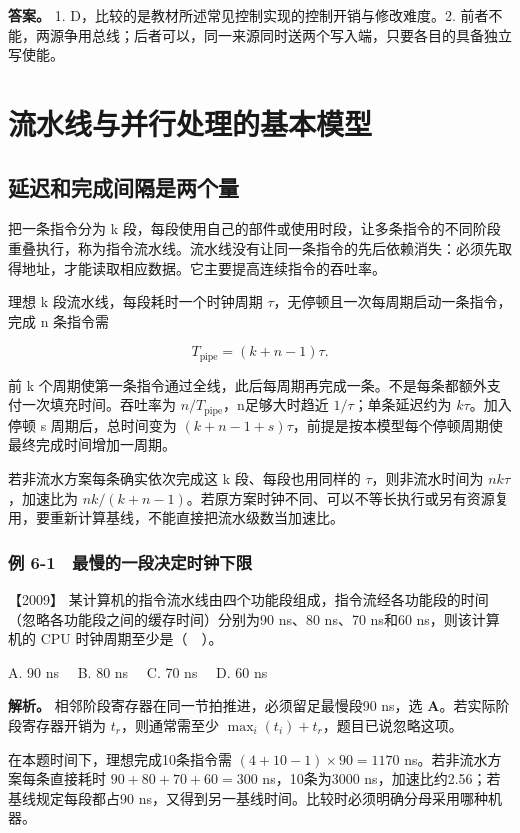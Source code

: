 \textbf{答案。} 1. D，比较的是教材所述常见控制实现的控制开销与修改难度。2. 前者不能，两源争用总线；后者可以，同一来源同时送两个写入端，只要各目的具备独立写使能。

\chapter{流水线与并行处理的基本模型}\label{co-ch6}

\section{延迟和完成间隔是两个量}\label{co-06-01}

把一条指令分为 k 段，每段使用自己的部件或使用时段，让多条指令的不同阶段重叠执行，称为指令流水线。流水线没有让同一条指令的先后依赖消失：必须先取得地址，才能读取相应数据。它主要提高连续指令的吞吐率。

理想 k 段流水线，每段耗时一个时钟周期 \(\tau\)，无停顿且一次每周期启动一条指令，完成 n 条指令需

\[
T_{\mathrm{pipe}}=(k+n-1)\tau.
\]

前 k 个周期使第一条指令通过全线，此后每周期再完成一条。不是每条都额外支付一次填充时间。吞吐率为 \(n/T_{\mathrm{pipe}}\)，n足够大时趋近 \(1/\tau\)；单条延迟约为 \(k\tau\)。加入停顿 s 周期后，总时间变为 \((k+n-1+s)\tau\)，前提是按本模型每个停顿周期使最终完成时间增加一周期。

若非流水方案每条确实依次完成这 k 段、每段也用同样的 \(\tau\)，则非流水时间为 \(nk\tau\)，加速比为 \(nk/(k+n-1)\)。若原方案时钟不同、可以不等长执行或另有资源复用，要重新计算基线，不能直接把流水级数当加速比。

\subsection{例 6-1　最慢的一段决定时钟下限}\label{co-ex6-1}

\noindent{}【2009】 某计算机的指令流水线由四个功能段组成，指令流经各功能段的时间（忽略各功能段之间的缓存时间）分别为90 ns、80 ns、70 ns和60 ns，则该计算机的 CPU 时钟周期至少是（　）。

A. 90 ns　 B. 80 ns　 C. 70 ns　 D. 60 ns


\textbf{解析。} 相邻阶段寄存器在同一节拍推进，必须留足最慢段90 ns，选 \textbf{A}。若实际阶段寄存器开销为 \(t_r\)，则通常需至少 \(\max_i(t_i)+t_r\)，题目已说忽略这项。

在本题时间下，理想完成10条指令需 \((4+10-1)\times90=1170\) ns。若非流水方案每条直接耗时 \(90+80+70+60=300\) ns，10条为3000 ns，加速比约2.56；若基线规定每段都占90 ns，又得到另一基线时间。比较时必须明确分母采用哪种机器。

